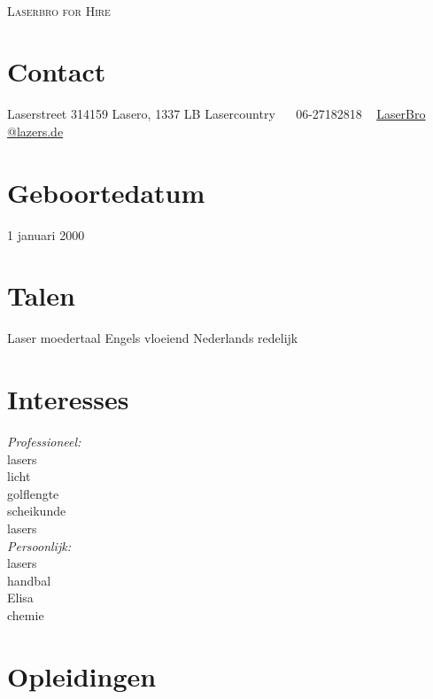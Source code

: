 \documentclass[]{friggeri-cv} %
\begin{document}
\\{\selectfont\scshape Laserbro for Hire}\\
{\selectfont\scshape  } %



\begin{aside} %
\section{Contact}
Laserstreet 314159
Lasero, 1337 LB
Lasercountry
~
\Mobilefone ~06-27182818
~
\Letter \href{mailto:yourname@gmail.com}{ LaserBro
@lazers.de}
\section{Geboortedatum}
1 januari 2000
\section{Talen}
Laser moedertaal
Engels vloeiend
Nederlands redelijk
\section{Interesses}
\emph{Professioneel:} \\lasers\\ licht \\golflengte \\scheikunde \\lasers \\\emph{Persoonlijk:} \\lasers \\handbal \\Elisa \\chemie
\end{aside}


\section{Opleidingen}
\end{document}
